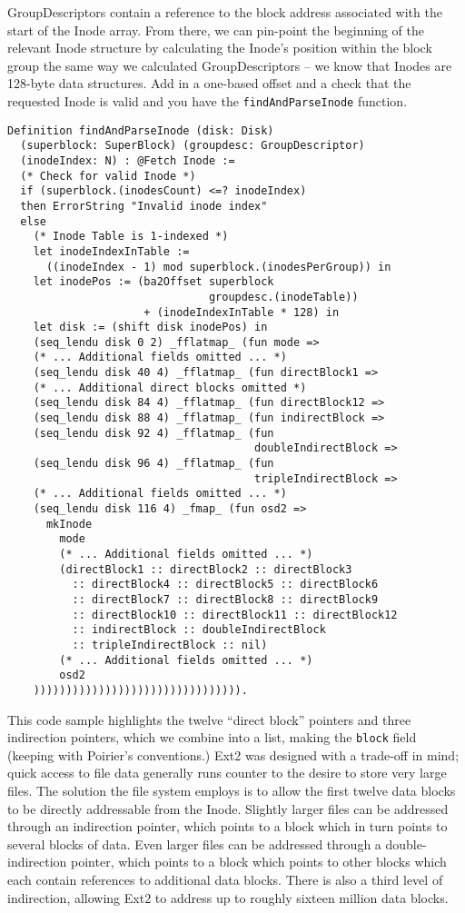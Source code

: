 \documentclass[nocopyrightspace,preprint]{sigplanconf}
\begin{document}
GroupDescriptors contain a reference to the block address associated with the
start of the Inode array. From there, we can pin-point the beginning of the
relevant Inode structure by calculating the Inode's position within the block
group the same way we calculated GroupDescriptors -- we know that Inodes are
128-byte data structures.  Add in a one-based offset and a check that the
requested Inode is valid and you have the {\tt findAndParseInode} function.

\begin{lstlisting}
Definition findAndParseInode (disk: Disk) 
  (superblock: SuperBlock) (groupdesc: GroupDescriptor)
  (inodeIndex: N) : @Fetch Inode :=
  (* Check for valid Inode *)
  if (superblock.(inodesCount) <=? inodeIndex)
  then ErrorString "Invalid inode index"
  else
    (* Inode Table is 1-indexed *)
    let inodeIndexInTable := 
      ((inodeIndex - 1) mod superblock.(inodesPerGroup)) in
    let inodePos := (ba2Offset superblock
                               groupdesc.(inodeTable))
                     + (inodeIndexInTable * 128) in
    let disk := (shift disk inodePos) in
    (seq_lendu disk 0 2) _fflatmap_ (fun mode =>
    (* ... Additional fields omitted ... *)
    (seq_lendu disk 40 4) _fflatmap_ (fun directBlock1 =>
    (* ... Additional direct blocks omitted *)
    (seq_lendu disk 84 4) _fflatmap_ (fun directBlock12 =>
    (seq_lendu disk 88 4) _fflatmap_ (fun indirectBlock =>
    (seq_lendu disk 92 4) _fflatmap_ (fun 
                                      doubleIndirectBlock =>
    (seq_lendu disk 96 4) _fflatmap_ (fun 
                                      tripleIndirectBlock =>
    (* ... Additional fields omitted ... *)
    (seq_lendu disk 116 4) _fmap_ (fun osd2 =>
      mkInode
        mode
        (* ... Additional fields omitted ... *)
        (directBlock1 :: directBlock2 :: directBlock3
          :: directBlock4 :: directBlock5 :: directBlock6
          :: directBlock7 :: directBlock8 :: directBlock9
          :: directBlock10 :: directBlock11 :: directBlock12
          :: indirectBlock :: doubleIndirectBlock
          :: tripleIndirectBlock :: nil)
        (* ... Additional fields omitted ... *)
        osd2
    )))))))))))))))))))))))))))))))).
\end{lstlisting}

This code sample highlights the twelve ``direct block'' pointers and three
indirection pointers, which we combine into a list, making the {\tt block}
field (keeping with Poirier's conventions.) Ext2 was designed with a trade-off
in mind; quick access to file data generally runs counter to the desire to
store very large files.  The solution the file system employs is to allow the
first twelve data blocks to be directly addressable from the Inode. Slightly
larger files can be addressed through an indirection pointer, which points to
a block which in turn points to several blocks of data. Even larger files can
be addressed through a double-indirection pointer, which points to a block
which points to other blocks which each contain references to additional data
blocks. There is also a third level of indirection, allowing Ext2 to address
up to roughly sixteen million data blocks.
\end{document}

